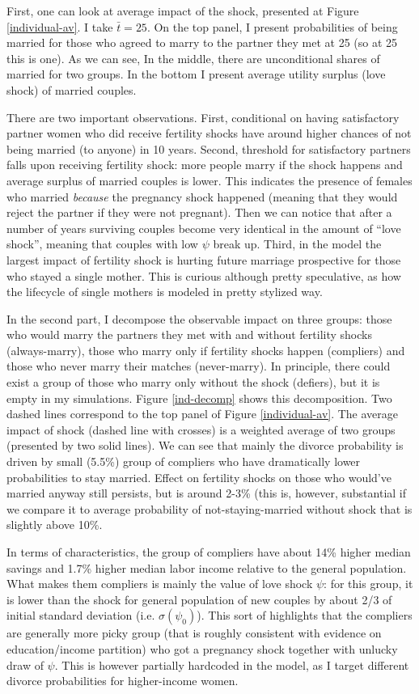 \documentclass[12pt,letter]{article}
\begin{document}
First, one can look at average impact of the shock, presented at Figure \ref{individual-av}. I take $\bar{t} = 25$. On the top panel, I present probabilities of being married for those who agreed to marry to the partner they met at 25 (so at 25 this is one). As we can see, In the middle, there are unconditional shares of married for two groups. In the bottom I present average utility surplus (love shock) of married couples.

There are two important observations. First, conditional on having satisfactory partner women who did receive fertility shocks have around higher chances of not being married (to anyone) in 10 years. Second, threshold for satisfactory partners falls upon receiving fertility shock: more people marry if the shock happens and average surplus of married couples is lower. This indicates the presence of females who married \emph{because} the pregnancy shock happened (meaning that they would reject the partner if they were not pregnant). Then we can notice that after a number of years surviving couples become very identical in the amount of ``love shock'', meaning that couples with low $\psi$ break up. Third, in the model the largest impact of fertility shock is hurting future marriage prospective for those who stayed a single mother. This is curious although pretty speculative, as how the lifecycle of single mothers is modeled in pretty stylized way.

In the second part, I decompose the observable impact on three groups: those who would marry the partners they met with and without fertility shocks (always-marry), those who marry only if fertility shocks happen (compliers) and those who never marry their matches (never-marry). In principle, there could exist a group of those who marry only without the shock (defiers), but it is empty in my simulations. Figure \ref{ind-decomp} shows this decomposition. Two dashed lines correspond to the top panel of Figure \ref{individual-av}. The average impact of shock (dashed line with crosses) is a weighted average of two groups (presented by two solid lines). We can see that mainly the divorce probability is driven by small (5.5\%) group of compliers who have dramatically lower probabilities to stay married. Effect on fertility shocks on those who would've married anyway still persists, but is around 2-3\% (this is, however, substantial if we compare it to average probability of not-staying-married without shock that is slightly above 10\%.  

In terms of characteristics, the group of compliers have about 14\% higher median savings and 1.7\% higher median labor income relative to the general population. What makes them compliers is mainly the value of love shock $\psi$: for this group, it is lower than the shock for general population of new couples by about 2/3 of initial standard deviation (i.e. $\sigma(\psi_0)$). This sort of highlights that  the compliers are generally more picky group (that is roughly consistent with evidence on education/income partition) who got a pregnancy shock together with unlucky draw of $\psi$. This is however partially hardcoded in the model, as I target different divorce probabilities for higher-income women.
\end{document}
